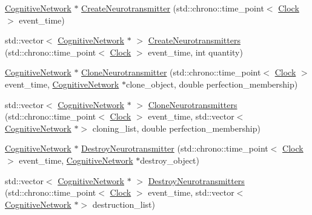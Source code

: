 \begin{DoxyCompactItemize}
\item 
\mbox{\hyperlink{classCognitiveNetwork}{Cognitive\+Network}} $\ast$ \mbox{\hyperlink{classMembraneChannel_aa8e78a1b0dd7c6b81cac09d33f01e6c2}{Create\+Neurotransmitter}} (std\+::chrono\+::time\+\_\+point$<$ \mbox{\hyperlink{universe_8h_a0ef8d951d1ca5ab3cfaf7ab4c7a6fd80}{Clock}} $>$ event\+\_\+time)
\item 
std\+::vector$<$ \mbox{\hyperlink{classCognitiveNetwork}{Cognitive\+Network}} $\ast$ $>$ \mbox{\hyperlink{classMembraneChannel_a24c791e6cfd906d49e0ceb8a24eeb4cb}{Create\+Neurotransmitters}} (std\+::chrono\+::time\+\_\+point$<$ \mbox{\hyperlink{universe_8h_a0ef8d951d1ca5ab3cfaf7ab4c7a6fd80}{Clock}} $>$ event\+\_\+time, int quantity)
\item 
\mbox{\hyperlink{classCognitiveNetwork}{Cognitive\+Network}} $\ast$ \mbox{\hyperlink{classMembraneChannel_af667720bd2214ea3a1e6d272b57d3a79}{Clone\+Neurotransmitter}} (std\+::chrono\+::time\+\_\+point$<$ \mbox{\hyperlink{universe_8h_a0ef8d951d1ca5ab3cfaf7ab4c7a6fd80}{Clock}} $>$ event\+\_\+time, \mbox{\hyperlink{classCognitiveNetwork}{Cognitive\+Network}} $\ast$clone\+\_\+object, double perfection\+\_\+membership)
\item 
std\+::vector$<$ \mbox{\hyperlink{classCognitiveNetwork}{Cognitive\+Network}} $\ast$ $>$ \mbox{\hyperlink{classMembraneChannel_a6426185a0d73c967adcb72e3a22b48b0}{Clone\+Neurotransmitters}} (std\+::chrono\+::time\+\_\+point$<$ \mbox{\hyperlink{universe_8h_a0ef8d951d1ca5ab3cfaf7ab4c7a6fd80}{Clock}} $>$ event\+\_\+time, std\+::vector$<$ \mbox{\hyperlink{classCognitiveNetwork}{Cognitive\+Network}} $\ast$$>$ cloning\+\_\+list, double perfection\+\_\+membership)
\item 
\mbox{\hyperlink{classCognitiveNetwork}{Cognitive\+Network}} $\ast$ \mbox{\hyperlink{classMembraneChannel_a985d8f93077b0f93daa9c311a22917a1}{Destroy\+Neurotransmitter}} (std\+::chrono\+::time\+\_\+point$<$ \mbox{\hyperlink{universe_8h_a0ef8d951d1ca5ab3cfaf7ab4c7a6fd80}{Clock}} $>$ event\+\_\+time, \mbox{\hyperlink{classCognitiveNetwork}{Cognitive\+Network}} $\ast$destroy\+\_\+object)
\item 
std\+::vector$<$ \mbox{\hyperlink{classCognitiveNetwork}{Cognitive\+Network}} $\ast$ $>$ \mbox{\hyperlink{classMembraneChannel_ad5dfc13b89aff0c7383e052113da1d8f}{Destroy\+Neurotransmitters}} (std\+::chrono\+::time\+\_\+point$<$ \mbox{\hyperlink{universe_8h_a0ef8d951d1ca5ab3cfaf7ab4c7a6fd80}{Clock}} $>$ event\+\_\+time, std\+::vector$<$ \mbox{\hyperlink{classCognitiveNetwork}{Cognitive\+Network}} $\ast$$>$ destruction\+\_\+list)

\end{DoxyCompactItemize}
